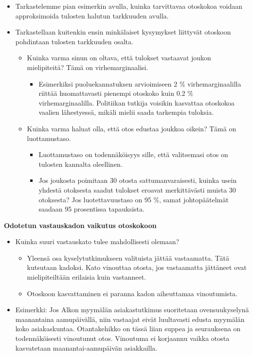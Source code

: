 \documentclass[
]{book}
\providecommand{\tightlist}{%
  \setlength{\itemsep}{0pt}\setlength{\parskip}{0pt}}
\begin{document}
\begin{itemize}
\tightlist
\item
  Tarkastelemme pian esimerkin avulla, kuinka tarvittavaa otoskokoa voidaan approksimoida tulosten halutun tarkkuuden avulla.
\item
  Tarkastellaan kuitenkin ensin minkälaiset kysymykset liittyvät otoskoon pohdintaan tulosten tarkkuuden osalta.

  \begin{itemize}
  \tightlist
  \item
    Kuinka varma sinun on oltava, että tulokset vastaavat joukon mielipiteitä? Tämä on virhemarginaalisi.

    \begin{itemize}
    \tightlist
    \item
      Esimerkiksi puoluekannatuksen arvioimiseen 2 \% virhemarginaalilla riittää huomattavasti pienempi otoskoko kuin 0.2 \% virhemarginaalilla. Politiikan tutkija voisikin kasvattaa otoskokoa vaalien lähestyessä, mikäli mielii saada tarkempia tuloksia.
    \end{itemize}
  \item
    Kuinka varma haluat olla, että otos edustaa joukkoa oikein? Tämä on luottamustaso.

    \begin{itemize}
    \tightlist
    \item
      Luottamustaso on todennäköisyys sille, että valitsemasi otos on tulosten kannalta oleellinen.
    \item
      Jos joukosta poimitaan 30 otosta sattumanvaraisesti, kuinka usein yhdestä otoksesta saadut tulokset eroavat merkittävästi muista 30 otoksesta? Jos luotettavuustaso on 95 \%, samat johtopäätelmät saadaan 95 prosentissa tapauksista.
    \end{itemize}
  \end{itemize}
\end{itemize}

\textbf{Odotetun vastauskadon vaikutus otoskokoon}

\begin{itemize}
\tightlist
\item
  Kuinka suuri vastauskato tulee mahdollisesti olemaan?

  \begin{itemize}
  \tightlist
  \item
    Yleensä osa kyselytutkimukseen valituista jättää vastaamatta. Tätä kutsutaan kadoksi. Kato vinouttaa otosta, jos vastaamatta jättäneet ovat mielipiteiltään erilaisia kuin vastanneet.
  \item
    Otoskoon kasvattaminen ei paranna kadon aiheuttamaa vinoutumista.
  \end{itemize}
\item
  Esimerkki: Jos Alkon myymälän asiakastutkimus suoritetaan ovensuukyselynä maanantaina aamupäivällä, niin vastaajat eivät luultavasti edusta myymälän koko asiakaskuntaa. Otantakehikko on tässä liian suppea ja seurauksena on todennäköisesti vinoutunut otos. Vinoutuma ei korjaannu vaikka otosta kasvatetaan maanantai-aamupäivän asiakkailla.
\end{itemize}
\end{document}
